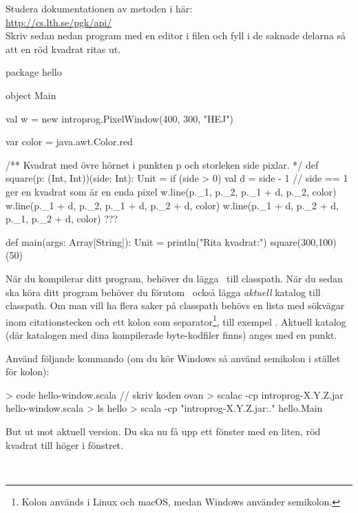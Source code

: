 \Subtask Studera dokumentationen av metoden  i  här:\\ \url{http://cs.lth.se/pgk/api/}
\\ Skriv sedan nedan program med en editor i filen  och fyll i de saknade delarna så att en röd kvadrat ritas ut.

\begin{Code}
package hello

object Main {
  val w = new introprog.PixelWindow(400, 300, "HEJ")

  var color = java.awt.Color.red

  /** Kvadrat med övre hörnet i punkten p och storleken side pixlar. */
  def square(p: (Int, Int))(side: Int): Unit = if (side > 0) {
    val d = side - 1  // side == 1 ger en kvadrat som är en enda pixel
    w.line(p._1,     p._2,     p._1 + d, p._2,     color)
    w.line(p._1 + d, p._2,     p._1 + d, p._2 + d, color)
    w.line(p._1 + d, p._2 + d, p._1,     p._2 + d, color)
    ???
  }

  def main(args: Array[String]): Unit = {
    println("Rita kvadrat:")
    square(300,100)(50)
  }
}
\end{Code}

\noindent
När du kompilerar ditt program, behöver du lägga \LibJar~till classpath.
När du sedan ska köra ditt program behöver du förutom  \LibJar~också lägga \emph{aktuell} katalog till classpath. Om man vill ha flera saker på classpath behövs en lista med sökvägar inom citationstecken och ett kolon som separator\footnote{Kolon används i Linux och macOS, medan Windows använder semikolon.}, till exempel .
Aktuell katalog (där katalogen  med dina kompilerade byte-kodfiler finns) anges med en punkt.

Använd följande kommando (om du kör Windows så använd semikolon i stället för kolon):
\begin{REPL}
> code hello-window.scala  // skriv koden ovan
> scalac -cp introprog-X.Y.Z.jar hello-window.scala
> ls hello
> scala -cp "introprog-X.Y.Z.jar:." hello.Main
\end{REPL}
\noindent But ut  mot aktuell version. Du ska nu få upp ett fönster med en liten, röd kvadrat till höger i fönstret.


\SOLUTION

\TaskSolved \what~

